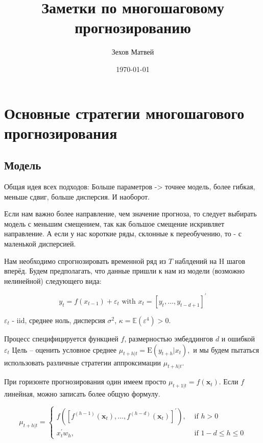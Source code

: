 \documentclass[a4paper,12pt]{article}
\author{Зехов Матвей}
\title{Заметки по многошаговому прогнозированию}
\date{\today}
\def \e{\varepsilon}
\def \e{\varepsilon}
\begin{document}
	
\maketitle
\tableofcontents

\section{Основные стратегии многошагового прогнозирования}

\subsection{Модель}

Общая идея всех подходов: Больше параметров -> точнее модель, более гибкая, меньше сдвиг, больше дисперсия. И наоборот.

Если нам важно более направление, чем значение прогноза, то следует выбирать модель с меньшим смещением, так как большое смещение искривляет направление. А если у нас короткие ряды, склонные к переобучению, то - с маленькой дисперсией.

Нам необходимо спрогнозировать временной ряд из $ T $ наблдений на H шагов вперёд. Будем предполагать, что данные пришли к нам из модели (возможно нелинейной) следующего вида:

\[
y_{t}=f\left(x_{t-1}\right)+\varepsilon_{t} \text { with } x_{t}=\left[y_{t}, \ldots, y_{t-d+1}\right]^{\prime}
\]

$ \e_t $ - iid, среднее ноль, дисперсия $ \sigma^2 $, $\kappa=\mathbb{E}\left(\varepsilon^{4}\right)>0$.

Процесс специфицируется функцией $ f $, размерностью эмбеддингов $ d $ и ошибкой $ \e_t $
Цель -- оценить условное среднее  $\mu_{t+h | t}=\mathrm{E}\left(y_{t+h} | x_{t}\right),$ и мы будем пытаться использовать различные стратегии аппроксимации $\mu_{t+h | t} .$

При горизонте прогнозирования один имеем просто 
$\mu_{t+1 | t}=f\left(\boldsymbol{x}_{t}\right)$. Если $ f $ линейная, можно записать более общую формулу.

\[
\mu_{t+h | t}=\left\{\begin{array}{ll}{f\left(\left[f^{(h-1)}\left(\boldsymbol{x}_{t}\right), \ldots, f^{(h-d)}\left(\boldsymbol{x}_{t}\right)\right]^{\prime}\right),} & {\text { if } h>0} \\ {x_{t}^{\prime} w_{h},} & {\text { if } 1-d \leq h \leq 0}\end{array}\right.
\] 
\end{document}
